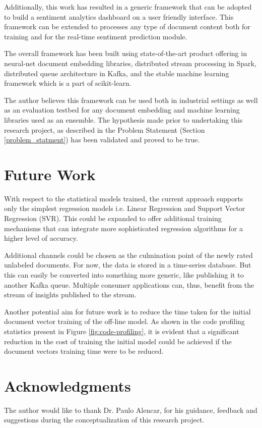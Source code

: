 \documentclass[conference]{IEEEtran}
\begin{document}
    Additionally, this work has resulted in a generic framework that can be adopted to build a sentiment analytics dashboard on a user friendly interface. 
    This framework can be extended to processes any type of document content both for training and for the real-time sentiment prediction module.

    The overall framework has been built using state-of-the-art product offering in neural-net document embedding libraries, distributed stream processing in Spark, distributed queue architecture in Kafka, and the stable machine learning framework which is a part of scikit-learn. 

    The author believes this framework can be used both in industrial settings as well as an evaluation testbed for any document embedding and machine learning libraries used as an ensemble. The hypothesis made prior to undertaking this research project, as described in the Problem Statement (Section \ref{problem_statment}) has been validated and proved to be true.

\vspace{5mm}

\section{Future Work}
    With respect to the statistical models trained, the current approach supports only the simplest regression models i.e. Linear Regression and Support Vector Regression (SVR). 
    This could be expanded to offer additional training mechanisms that can integrate more sophisticated regression algorithms for a higher level of accuracy.
     
    Additional channels could be chosen as the culmination point of the newly rated unlabeled documents.
    For now, the data is stored in a time-series database.
    But this can easily be converted into something more generic, like publishing it to another Kafka queue.
    Multiple consumer applications can, thus, benefit from the stream of insights published to the stream.

    Another potential aim for future work is to reduce the time taken for the initial document vector training of the off-line model.
    As shown in the code profiling statistics present in Figure \ref{fig:code-profiling}, it is evident that a significant reduction in the cost of training the initial model could be achieved if the document vectors training time were to be reduced.

\vspace{5mm}

\section{Acknowledgments}
    The author would like to thank Dr. Paulo Alencar, for his guidance, feedback and suggestions during the conceptualization of this research project.

\vspace{5mm}



\end{document}
